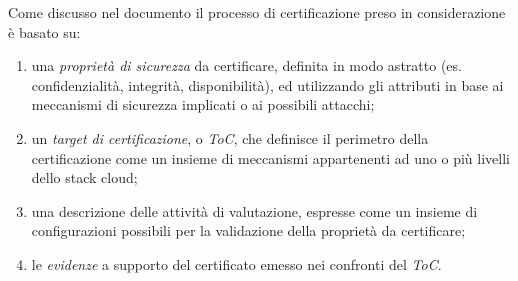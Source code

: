 \documentclass[../main.tex]{subfiles}
\begin{document}
Come discusso nel documento \cite{TrustModelCloudAnisDamArd} il processo di certificazione preso in considerazione è basato su:
\begin{enumerate}
\item una \textit{proprietà di sicurezza} da certificare, definita in modo astratto (es. confidenzialità, integrità, disponibilità), ed utilizzando gli attributi in base ai meccanismi di sicurezza implicati o ai possibili attacchi;
\item un \textit{target di certificazione}, o \textit{ToC}, che definisce il perimetro della certificazione come un insieme di meccanismi appartenenti ad uno o più livelli dello stack cloud;
\item una descrizione delle attività di valutazione, espresse come un insieme di configurazioni possibili per la validazione della proprietà da certificare;
\item le \textit{evidenze} a supporto del certificato emesso nei confronti del \textit{ToC}.
\end{enumerate}
\end{document}
